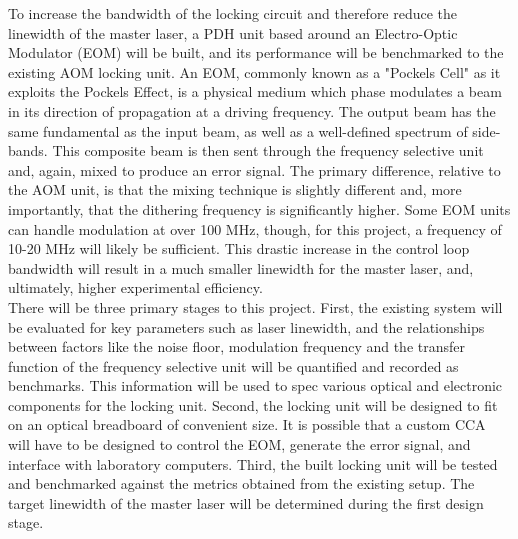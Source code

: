 To increase the bandwidth of the locking circuit and therefore 
reduce the linewidth of the master laser, a PDH unit based around an 
Electro-Optic Modulator (EOM) will be built, and its performance will be 
benchmarked to the existing AOM locking unit. An EOM, commonly known as 
a "Pockels Cell" as it exploits the Pockels Effect, is a physical medium 
which phase modulates a beam in its direction of propagation at a 
driving frequency. The output beam has the same fundamental as the input 
beam, as well as a well-defined spectrum of side-bands. This composite 
beam is then sent through the frequency selective unit and, again, mixed 
to produce an error signal. The primary difference, relative to the AOM 
unit, is that the mixing technique is slightly different and, more 
importantly, that the dithering frequency is significantly higher. Some 
EOM units can handle modulation at over 100 MHz, though, for this 
project, a frequency of 10-20 MHz will likely be sufficient. This 
drastic increase in the control loop bandwidth will result in a much 
smaller linewidth for the master laser, and, ultimately, higher 
experimental efficiency. \\

There will be three primary stages to this project. First, the 
existing system will be evaluated for key parameters such as laser 
linewidth, and the relationships between factors like the noise floor,
modulation frequency and the transfer function of the frequency selective
unit will be quantified and recorded as benchmarks. This information 
will be used to spec various optical and electronic components for the
locking unit. Second, the locking unit will be designed to fit on an 
optical breadboard of convenient size. It is possible that a custom CCA 
will have to be designed to control the EOM, generate the error signal, 
and interface with laboratory computers. Third, the built locking unit 
will be tested and benchmarked against the metrics obtained from the 
existing setup. The target linewidth of the master laser will be determined during the first design stage.
 
